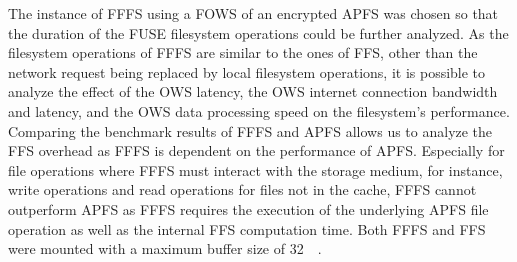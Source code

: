 The instance of \gls{FFFS} using a \gls{FOWS} of an encrypted \gls{APFS} was chosen so that the duration of the \gls{FUSE} filesystem operations could be further analyzed. As the filesystem operations of \gls{FFFS} are similar to the ones of \gls{FFS}, other than the network request being replaced by local filesystem operations, it is possible to analyze the effect of the \gls{OWS} latency, the \gls{OWS} internet connection bandwidth and latency, and the \gls{OWS} data processing speed on the filesystem's performance. Comparing the benchmark results of \gls{FFFS} and \gls{APFS} allows us to analyze the \gls{FFS} overhead as \gls{FFFS} is dependent on the performance of \gls{APFS}. Especially for file operations where \gls{FFFS} must interact with the storage medium, for instance, write operations and read operations for files not in the cache, \gls{FFFS} cannot outperform \gls{APFS} as \gls{FFFS} requires the execution of the underlying \gls{APFS} file operation as well as the internal \gls{FFS} computation time. Both \gls{FFFS} and \gls{FFS} were mounted with a maximum buffer size of \SI{32}{\mega\byte}.

